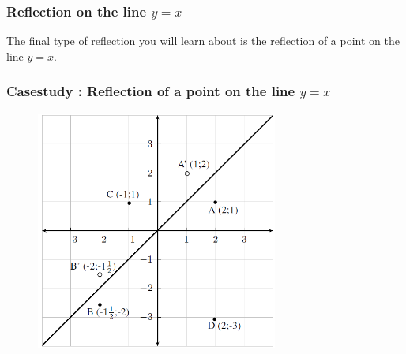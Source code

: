         
        \label{m39358*uid77754}
            \subsubsection{ Reflection on the line $y=x$}
            \nopagebreak
            
          
          \label{m39358*id71812}The final type of reflection you will learn about is the reflection of a point on the line $y=x$.\par 
\label{m39358*secfhsst!!!underscore!!!id2638}
            \subsubsection{  Casestudy : Reflection of a point on the line $y=x$ }
            \nopagebreak
            
          \label{m39358*id71852}
            
    \setcounter{subfigure}{0}


	\begin{figure}[H] %
    \begin{center}
    \label{m39358*id71857!!!underscore!!!media}\label{m39358*id71857!!!underscore!!!printimage}\includegraphics[width=300px]{col11306.imgs/m39358_MG10C14_029.png} %
        
      \vspace{2pt}
    \vspace{.1in}
    
    \end{center}

 \end{figure}   

    \addtocounter{footnote}{-0}
    
